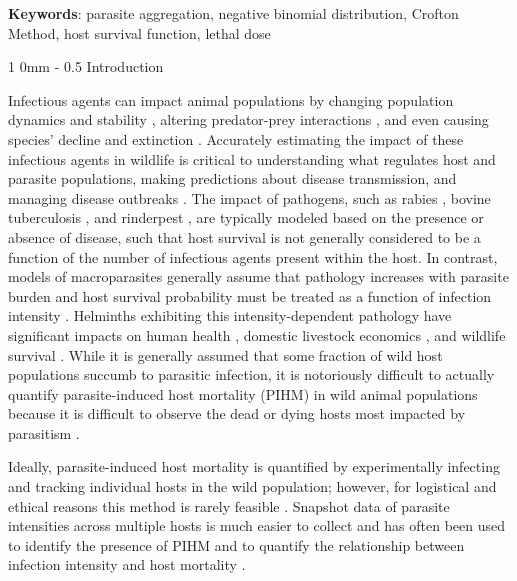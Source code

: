 \documentclass[12pt, a4paper]{article}
\makeatletter
\renewcommand{\section}{\@startsection
{section}%
{1}%
{0mm}%
{-\baselineskip}%
{0.5\baselineskip}%
{\normalfont\bf\large}} %
\makeatother
\begin{document}
\textbf{Keywords}: parasite aggregation, negative binomial distribution, Crofton Method, host survival function, lethal dose


\section{Introduction}

Infectious agents can impact animal populations by changing
population dynamics and stability \citep{Dobson1992,Tompkins2002}, altering predator-prey interactions \citep{Joly2004}, and
even causing species' decline and extinction \citep{DeCastro2005a,McCallum2012b}. Accurately estimating the impact
of these infectious agents in wildlife is critical to understanding what
regulates host and parasite populations, making predictions about disease
transmission, and managing disease outbreaks \citep{Langwig2015}. The impact of pathogens, such as rabies \citep{Coyne1989}, bovine tuberculosis \citep{Cox2005}, and
rinderpest \citep{Tille1991}, are typically modeled based on the presence or absence of disease, such that host survival is not generally considered to be a function of the number of infectious agents present within the host.  In contrast, models of macroparasites generally assume that pathology increases with parasite burden and host survival probability must be treated as a function of infection intensity \citep{AndersonandMay1978}. Helminths exhibiting this intensity-dependent pathology have significant impacts on human health \citep{Brooker2004}, domestic livestock economics \citep{Roeber2013}, and wildlife survival \citep{Kirk2003,Logiudice2003}. While it is generally assumed that some fraction of wild host populations succumb to parasitic infection, it is notoriously difficult to actually quantify parasite-induced host mortality (PIHM) in wild animal populations because it is difficult to observe the dead or dying hosts most impacted by parasitism \citep{McCallum2000a}.

Ideally, parasite-induced host mortality is
quantified by experimentally infecting and tracking individual hosts in the
wild population; however, for logistical and ethical reasons this method is
rarely feasible \citep{McCallum2000a}. Snapshot data of parasite intensities across multiple hosts is much easier to collect and has
often been used to identify the presence of PIHM \citep{Crofton1971a,Lester1977,Lester1984,Lanciani1989,Royce1990,Ferguson2011} and to quantify the
relationship between infection intensity and host mortality \citep{Adjei1986}.
\end{document}
